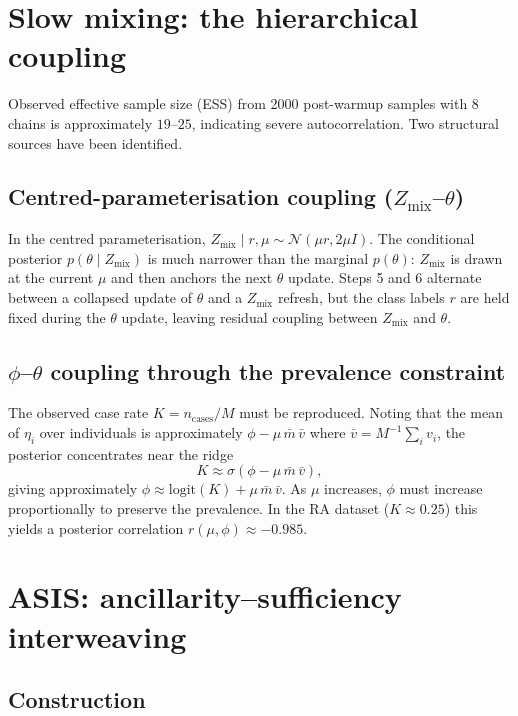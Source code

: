 \documentclass[11pt,a4paper]{article}
\begin{document}
\section{Slow mixing: the hierarchical coupling}
\label{sec:slow}

Observed effective sample size (ESS) from 2000 post-warmup samples with 8 chains is approximately $19$--$25$, indicating severe autocorrelation. Two structural sources have been identified.

\subsection{Centred-parameterisation coupling ($Z_{\text{mix}}$--$\theta$)}

In the centred parameterisation, $Z_{\text{mix}} \mid r, \mu \sim \mathcal{N}(\mu r, 2\mu I)$. The conditional posterior $p(\theta \mid Z_{\text{mix}})$ is much narrower than the marginal $p(\theta)$: $Z_{\text{mix}}$ is drawn at the current $\mu$ and then anchors the next $\theta$ update. Steps 5 and 6 alternate between a collapsed update of $\theta$ and a $Z_{\text{mix}}$ refresh, but the class labels $r$ are held fixed during the $\theta$ update, leaving residual coupling between $Z_{\text{mix}}$ and $\theta$.

\subsection{$\phi$--$\theta$ coupling through the prevalence constraint}

The observed case rate $K = n_{\text{cases}}/M$ must be reproduced. Noting that the mean of $\eta_i$ over individuals is approximately $\phi - \mu\,\bar{m}\,\bar{v}$ where $\bar{v} = M^{-1}\sum_i v_i$, the posterior concentrates near the ridge
\begin{equation}
  K \approx \sigma\!\left(\phi - \mu\,\bar{m}\,\bar{v}\right),
\end{equation}
giving approximately $\phi \approx \text{logit}(K) + \mu\,\bar{m}\,\bar{v}$. As $\mu$ increases, $\phi$ must increase proportionally to preserve the prevalence. In the RA dataset ($K \approx 0.25$) this yields a posterior correlation $r(\mu, \phi) \approx -0.985$.

\section{ASIS: ancillarity--sufficiency interweaving}

\subsection{Construction}
\end{document}
